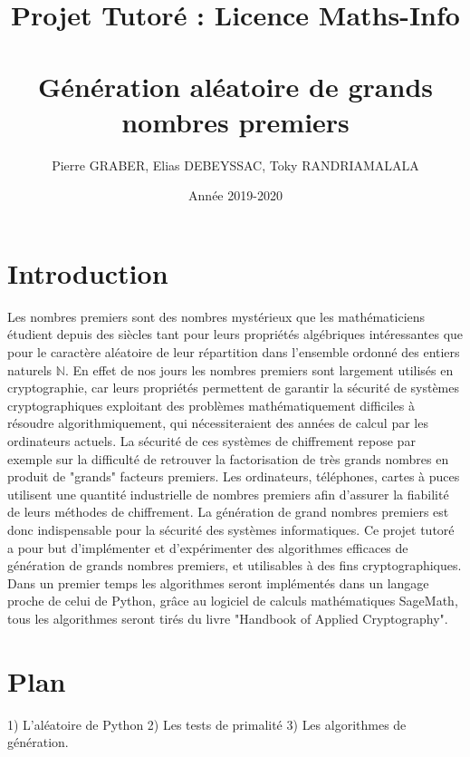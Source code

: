 \documentclass{article}
\title{Projet Tutoré : Licence Maths-Info
\section*{Génération aléatoire de grands nombres premiers }
\date{ Année 2019-2020}
}
\author{Pierre GRABER, Elias DEBEYSSAC, Toky RANDRIAMALALA}
\begin{document}
\maketitle

\section*{Introduction}
Les nombres premiers sont des nombres mystérieux que les mathématiciens étudient depuis des siècles tant pour leurs propriétés algébriques intéressantes que pour le caractère  aléatoire de leur répartition dans l'ensemble ordonné des entiers naturels $\mathbb{N}$. En effet de nos jours les nombres premiers sont largement utilisés  en cryptographie, car  leurs propriétés permettent de garantir la sécurité de systèmes cryptographiques exploitant des problèmes mathématiquement difficiles à résoudre algorithmiquement, qui nécessiteraient des années de calcul par les ordinateurs actuels. \newline 
La sécurité de ces systèmes de chiffrement repose par exemple sur la difficulté de retrouver la factorisation de très grands nombres en produit de "grands" facteurs premiers. Les ordinateurs, téléphones, cartes à puces utilisent une quantité industrielle de nombres premiers afin d'assurer la fiabilité de leurs méthodes de chiffrement. La génération de grand nombres premiers est donc indispensable pour la sécurité des systèmes informatiques. Ce projet tutoré a pour but d'implémenter et d'expérimenter des algorithmes efficaces de génération de grands nombres premiers, et utilisables à des fins cryptographiques. Dans un premier temps les algorithmes seront implémentés dans un langage proche de celui de Python, grâce au logiciel de calculs mathématiques SageMath, tous les algorithmes seront tirés du livre "Handbook of Applied Cryptography".

\section*{Plan}
{\Large 1) {L'aléatoire de Python}}\newline
{\Large 2) {Les tests de primalité}}\newline
{\Large 3) {Les algorithmes de génération.}}
\end{document}
